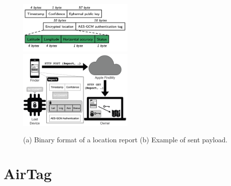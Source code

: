 \documentclass[english]{article}
\begin{document}
\begin{figure}
	\centering
	\includegraphics[width=0.5\textwidth]{images/packet.png}\hfill 
	\includegraphics[width=0.5\textwidth]{images/findmysec.png}
	\caption{(a) Binary format of a location report \quad (b) Example of sent payload.}
	\label{comparison}
\end{figure}


\section{AirTag}\label{sec:at}

\printbibliography
\nocite{*}
\end{document}
